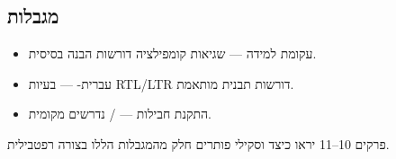 \subsection{מגבלות}

\begin{itemize}[rightmargin=2em]
  \item עקומת למידה --- שגיאות קומפילציה דורשות הבנה בסיסית.
  \item עברית- --- בעיות RTL/LTR דורשות תבנית מותאמת.
  \item התקנת חבילות --- / נדרשים מקומית.
\end{itemize}

פרקים 10--11 יראו כיצד  וסקילי  פותרים חלק מהמגבלות
הללו בצורה רפטבילית.
